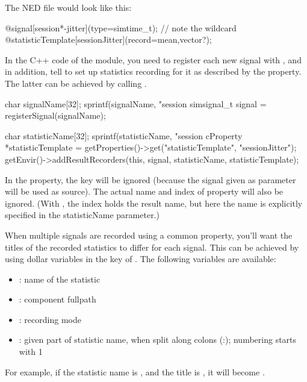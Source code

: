 The NED file would look like this:

\begin{ned}
@signal[session*-jitter](type=simtime_t); // note the wildcard
@statisticTemplate[sessionJitter](record=mean,vector?);
\end{ned}

In the C++ code of the module, you need to register each new signal with
, and in addition, tell {\opp} to set up statistics
recording for it as described by the  property.
The latter can be achieved by calling .

\begin{cpp}
char signalName[32];
sprintf(signalName, "session%
simsignal_t signal = registerSignal(signalName);

char statisticName[32];
sprintf(statisticName, "session%
cProperty *statisticTemplate =
    getProperties()->get("statisticTemplate", "sessionJitter");
getEnvir()->addResultRecorders(this, signal, statisticName, statisticTemplate);
\end{cpp}

In the  property, the  key will be
ignored (because the signal given as parameter will be used as source). The
actual name and index of property will also be ignored. (With
, the index holds the result name, but here the name is
explicitly specified in the statisticName parameter.)

When multiple signals are recorded using a common 
property, you'll want the titles of the recorded statistics to differ
for each signal. This can be achieved by using dollar variables in the
 key of . The following variables
are available:

\begin{itemize}
  \item {}: name of the statistic
  \item {}: component fullpath
  \item {}: recording mode
  \item {}: given part of statistic name, when split
    along colons (:); numbering starts with 1
\end{itemize}

For example, if the statistic name is ,
and the title is , it will become
.



